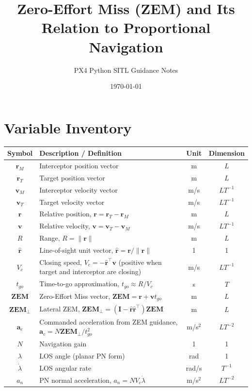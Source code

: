 \documentclass[11pt,a4paper]{article}
\title{Zero-Effort Miss (ZEM) and Its Relation to Proportional Navigation}
\author{PX4 Python SITL Guidance Notes}
\date{\today}
\begin{document}
\maketitle

\section{Variable Inventory}
\begin{center}
\renewcommand{\arraystretch}{1.2}
\begin{tabular}{|c|p{7.1cm}|c|c|}
\hline
\textbf{Symbol} & \textbf{Description / Definition} & \textbf{Unit} & \textbf{Dimension} \\
\hline
$\mathbf{r}_M$ & Interceptor position vector & m & $L$ \\
\hline
$\mathbf{r}_T$ & Target position vector & m & $L$ \\
\hline
$\mathbf{v}_M$ & Interceptor velocity vector & m/s & $LT^{-1}$ \\
\hline
$\mathbf{v}_T$ & Target velocity vector & m/s & $LT^{-1}$ \\
\hline
$\mathbf{r}$ & Relative position, $\mathbf{r}=\mathbf{r}_T-\mathbf{r}_M$ & m & $L$ \\
\hline
$\mathbf{v}$ & Relative velocity, $\mathbf{v}=\mathbf{v}_T-\mathbf{v}_M$ & m/s & $LT^{-1}$ \\
\hline
$R$ & Range, $R=\lVert \mathbf{r} \rVert$ & m & $L$ \\
\hline
$\hat{\mathbf{r}}$ & Line-of-sight unit vector, $\hat{\mathbf{r}}=\mathbf{r}/\lVert\mathbf{r}\rVert$ & 1 & 1 \\
\hline
$V_c$ & Closing speed, $V_c=-\hat{\mathbf{r}}^\top\mathbf{v}$ (positive when target and interceptor are closing) & m/s & $LT^{-1}$ \\
\hline
$t_{go}$ & Time-to-go approximation, $t_{go}\approx R/V_c$ & s & $T$ \\
\hline
$\mathbf{ZEM}$ & Zero-Effort Miss vector, $\mathbf{ZEM}=\mathbf{r}+\mathbf{v}t_{go}$ & m & $L$ \\
\hline
$\mathbf{ZEM}_{\perp}$ & Lateral ZEM, $\mathbf{ZEM}_{\perp}=(\mathbf{I}-\hat{\mathbf{r}}\hat{\mathbf{r}}^\top)\mathbf{ZEM}$ & m & $L$ \\
\hline
$\mathbf{a}_c$ & Commanded acceleration from ZEM guidance, $\mathbf{a}_c=N\mathbf{ZEM}_{\perp}/t_{go}^2$ & m/s$^2$ & $LT^{-2}$ \\
\hline
$N$ & Navigation gain & 1 & 1 \\
\hline
$\lambda$ & LOS angle (planar PN form) & rad & 1 \\
\hline
$\dot{\lambda}$ & LOS angular rate & rad/s & $T^{-1}$ \\
\hline
$a_n$ & PN normal acceleration, $a_n=NV_c\dot{\lambda}$ & m/s$^2$ & $LT^{-2}$ \\
\hline
\end{tabular}
\end{center}
\end{document}
